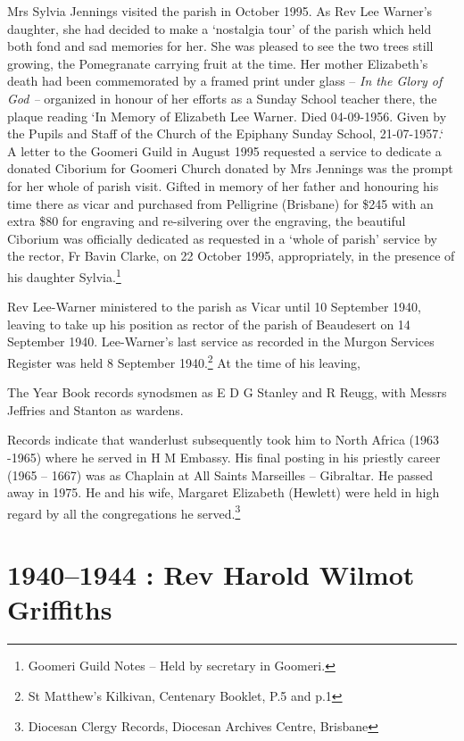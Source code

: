 Mrs Sylvia Jennings visited the parish in October 1995. As Rev Lee Warner's daughter, she had decided to make a `nostalgia tour' of the parish which held both fond and sad memories for her. She was pleased to see the two trees still growing, the Pomegranate carrying fruit at the time. Her mother Elizabeth's death had been commemorated by a framed print under glass -- \emph{In the Glory of God --} organized in honour of her efforts as a Sunday School teacher there, the plaque reading `In Memory of Elizabeth Lee Warner. Died 04-09-1956. Given by the Pupils and Staff of the Church of the Epiphany Sunday School, 21-07-1957.` A letter to the Goomeri Guild in August 1995 requested a service to dedicate a donated Ciborium for Goomeri Church donated by Mrs Jennings was the prompt for her whole of parish visit. Gifted in memory of her father and honouring his time there as vicar and purchased from Pelligrine (Brisbane) for \$245 with an extra \$80 for engraving and re-silvering over the engraving, the beautiful Ciborium was officially dedicated as requested in a `whole of parish' service by the rector, Fr Bavin Clarke, on 22 October 1995, appropriately, in the presence of his daughter Sylvia.\footnote{Goomeri Guild Notes -- Held by secretary in Goomeri.}

Rev Lee-Warner ministered to the parish as Vicar until 10 September 1940, leaving to take up his position as rector of the parish of Beaudesert on 14 September 1940. Lee-Warner's last service as recorded in the Murgon Services Register was held 8 September 1940.\footnote{St Matthew's Kilkivan, Centenary Booklet, P.5 and p.1} At the time of his leaving,

The Year Book records synodsmen as E D G Stanley and R Reugg, with Messrs Jeffries and Stanton as wardens.

Records indicate that wanderlust subsequently took him to North Africa (1963 -1965) where he served in H M Embassy. His final posting in his priestly career (1965 -- 1667) was as Chaplain at All Saints Marseilles -- Gibraltar. He passed away in 1975. He and his wife, Margaret Elizabeth (Hewlett) were held in high regard by all the congregations he served.\footnote{Diocesan Clergy Records, Diocesan Archives Centre, Brisbane}

\hypertarget{rev-harold-wilmot-griffiths}{%
\chapter{1940--1944 : Rev Harold Wilmot Griffiths}\label{rev-harold-wilmot-griffiths}}

